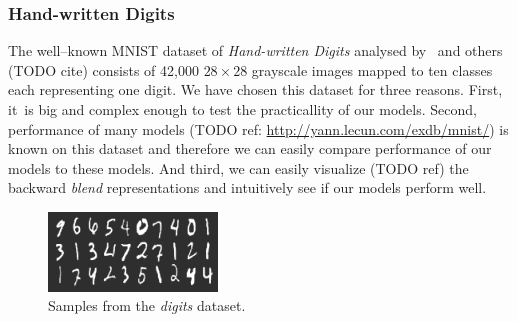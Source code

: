 \subsubsection{Hand-written Digits} 
\label{sec:datasets-digits} 

The well--known MNIST dataset of \emph{Hand-written Digits} analysed by~\citet{lecun1998gradient} and others (TODO cite) consists of 42,000 $28 \times 28$ grayscale images mapped to ten classes each representing one digit. We have chosen this dataset for three reasons. First, it~is big and complex enough to test the practicallity of our models. Second, performance of many models (TODO ref: \url{http://yann.lecun.com/exdb/mnist/}) is known on this dataset and therefore we can easily compare performance of our models to these models. And third, we can easily visualize (TODO ref) the backward \emph{blend} representations and intuitively see if our models perform well. 

\begin{figure}[H]
  \centering
  \includegraphics[width=0.4\textwidth]{img/digits.png} 
  \caption{Samples from the \emph{digits} dataset.}
  \label{fig:datasets-digits}
\end{figure}


